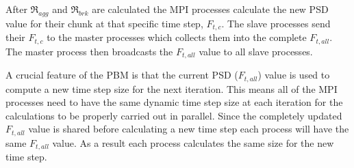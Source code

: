 \documentclass[preprint,11pt,authoryear]{elsarticle}
\begin{document}
	    \par After $\Re_{agg}$ and $\Re_{brk}$ are calculated the MPI processes calculate the new PSD value for their chunk at that specific time step, $F_{t,c}$. The slave processes send their $F_{t,c}$ to the master processes which collects them into the complete $F_{t,all}$. The master process then broadcasts the $F_{t,all}$ value to all slave processes. 	
	    \par A crucial feature of the PBM is that the current PSD ($F_{t,all}$) value is used to compute a new time step size for the next iteration. This means all of the MPI processes need to have the same dynamic time step size at each iteration for the calculations to be properly carried out in parallel. Since the completely updated $F_{t,all}$ value is shared before calculating a new time step each process will have the same $F_{t,all}$ value. As a result each process calculates the same size for the new time step. 
	
\end{document}
